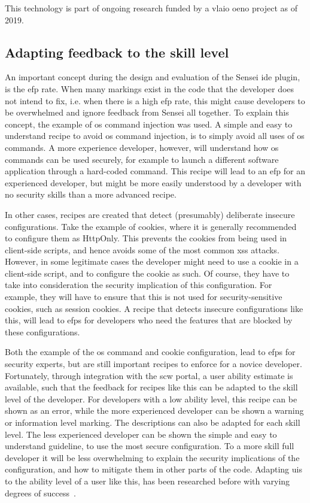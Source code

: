 This technology is part of ongoing research funded by a \gls{vlaio} \gls{oeno} project as of 2019.

\subsection{Adapting feedback to the skill level}
An important concept during the design and evaluation of the Sensei \gls{ide} plugin, is the \gls{efp} rate.
When many markings exist in the code that the developer does not intend to fix, i.e. when there is a high \gls{efp} rate, this might cause developers to be overwhelmed and ignore feedback from Sensei all together.
To explain this concept, the example of \gls{os} command injection was used.
A simple and easy to understand recipe to avoid \gls{os} command injection, is to simply avoid all uses of \gls{os} commands.
A more experience developer, however, will understand how \gls{os} commands can be used securely, for example to launch a different software application through a hard-coded command.
This recipe will lead to an \gls{efp} for an experienced developer, but might be more easily understood by a developer with no security skills than a more advanced recipe.

In other cases, recipes are created that detect (presumably) deliberate insecure configurations.
Take the example of cookies, where it is generally recommended to configure them as HttpOnly.
This prevents the cookies from being used in client-side scripts, and hence avoids some of the most common \gls{xss} attacks.
However, in some legitimate cases the developer might need to use a cookie in a client-side script, and to configure the cookie as such.
Of course, they have to take into consideration the security implication of this configuration.
For example, they will have to ensure that this is not used for security-sensitive cookies, such as session cookies.
A recipe that detects insecure configurations like this, will lead to \glspl{efp} for developers who need the features that are blocked by these configurations.

Both the example of the \gls{os} command and cookie configuration, lead to \glspl{efp} for security experts, but are still important recipes to enforce for a novice developer.
Fortunately, through integration with the \gls{scw} portal, a user ability estimate is available, such that the feedback for recipes like this can be adapted to the skill level of the developer.
For developers with a low ability level, this recipe can be shown as an error, while the more experienced developer can be shown a warning or information level marking.
The descriptions can also be adapted for each skill level.
The less experienced developer can be shown the simple and easy to understand guideline, to use the most secure configuration.
To a more skill full developer it will be less overwhelming to explain the security implications of the configuration, and how to mitigate them in other parts of the code.
Adapting \glspl{ui} to the ability level of a user like this, has been researched before with varying degrees of success~\cite{johnson2015bespoke, cockburn2014supporting}.